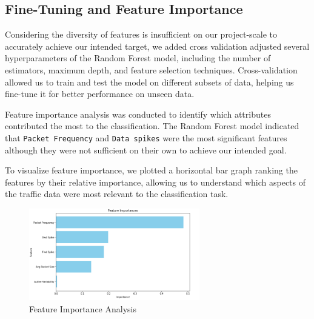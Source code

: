 \subsection{Fine-Tuning and Feature Importance}
Considering the diversity of features is insufficient on our project-scale to accurately achieve our intended target, we added cross validation adjusted several hyperparameters of the Random Forest model, including the number of estimators, maximum depth, and feature selection techniques. Cross-validation allowed us to train and test the model on different subsets of data, helping us fine-tune it for better performance on unseen data.

Feature importance analysis was conducted to identify which attributes contributed the most to the classification. The Random Forest model indicated that \texttt{Packet Frequency} and \texttt{Data spikes} were the most significant features although they were not sufficient on their own to achieve our intended goal.

To visualize feature importance, we plotted a horizontal bar graph ranking the features by their relative importance, allowing us to understand which aspects of the traffic data were most relevant to the classification task.

\begin{figure}[H]
    \centering
    \includegraphics[height=4cm]{features_importance.png} 
    \caption{Feature Importance Analysis}
    \label{fig:features_importance}
\end{figure}


